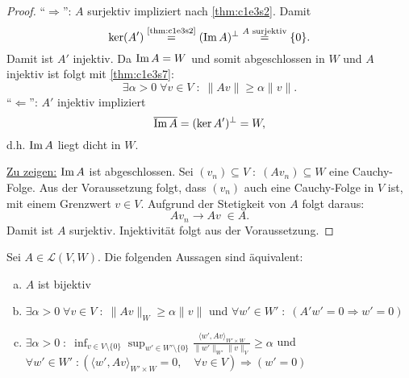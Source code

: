 \documentclass[../skript.tex]{subfiles}
\begin{document}
\begin{proof}
``$\Rightarrow$'': $A$ surjektiv impliziert nach \cref{thm:c1e3s2}. Damit
\[
	\ker(A') \overset{\text{\cref{thm:c1e3s2}}}{=} (\im A)^\perp \overset{A \text{ surjektiv}}{=} \{ 0 \}.
\]
Damit ist $A'$ injektiv.
Da $\operatorname{Im} A = W$ und somit abgeschlossen in $W$ und $A$ injektiv ist folgt mit \cref{thm:c1e3s7}:
\[
	\exists \alpha > 0 \; \forall v \in V \; : \; \| A v \| \geq \alpha \| v \|.
\]
``$\Leftarrow$'': $A'$ injektiv impliziert
\[
	\overline{\operatorname{Im} A} = (\ker A')^\perp = W,
\]
d.h. $\operatorname{Im} A$ liegt dicht in $W$.

\underline{Zu zeigen:} $\operatorname{Im} A$ ist abgeschlossen.
Sei $(v_n) \subseteq V \; : \; (A v_n) \subseteq W$ eine Cauchy-Folge.
Aus der Voraussetzung folgt, dass $(v_n)$ auch eine Cauchy-Folge in $V$ ist, mit einem Grenzwert $v \in V$. Aufgrund der Stetigkeit von $A$ folgt daraus:
\[
	Av_n \to Av \; \in  A.
\]
Damit ist $A$ surjektiv. Injektivität folgt aus der Voraussetzung.
\end{proof}
\begin{corollary} %
\label{thm:c1e3s9}
Sei $A \in \mathcal{L}(V, W)$. Die folgenden Aussagen sind äquivalent:
\begin{enumerate}[(a)]
\item $A$ ist bijektiv
\item $\exists \alpha > 0 \; \forall v \in V \; : \; \| A v \|_W \geq \alpha \| v \|$ und $\forall w' \in W' \; : \; (A' w' = 0 \Rightarrow w' = 0)$
\item $\exists \alpha > 0 \; : \; \inf_{v \in V \setminus \{ 0\}} \sup_{w' \in W' \setminus \{ 0\}} \frac{\langle w', Av \rangle_{W' \times W}}{\| w' \|_{W'} \| v \|_V} \geq \alpha$ und \\ $\forall w' \in W' \; : \left(\langle w', Av\rangle_{W'\times W} =0, \quad \forall v\in V \right) \Rightarrow (w'=0)$
\end{enumerate}
\end{corollary}
\end{document}
